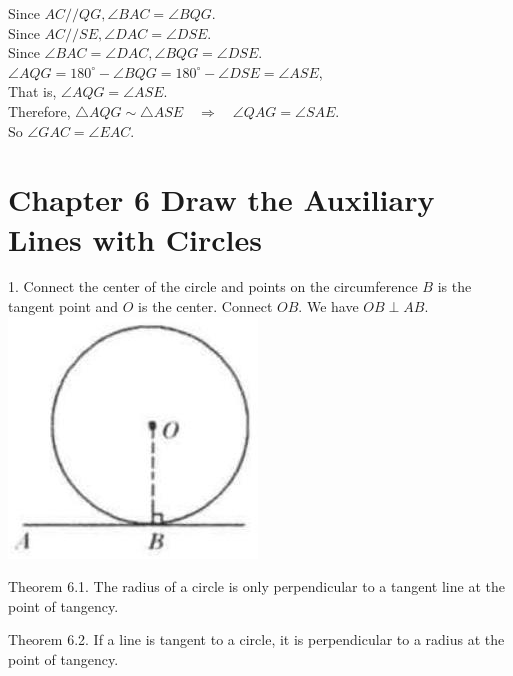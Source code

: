 \documentclass[10pt]{article}
\begin{document}
Since \(A C / / Q G, \angle B A C=\angle B Q G\).\\
Since \(A C / / S E, \angle D A C=\angle D S E\).\\
Since \(\angle B A C=\angle D A C, \angle B Q G=\angle D S E\).\\
\(\angle A Q G=180^{\circ}-\angle B Q G=180^{\circ}-\angle D S E=\angle A S E\),\\
That is, \(\angle A Q G=\angle A S E\).\\
Therefore, \(\triangle A Q G \sim \triangle A S E \quad \Rightarrow \quad \angle Q A G=\angle S A E\).\\
So \(\angle G A C=\angle E A C\).

\section*{Chapter 6 Draw the Auxiliary Lines with Circles}
1. Connect the center of the circle and points on the circumference
\(B\) is the tangent point and \(O\) is the center. Connect \(O B\). We have \(O B \perp A B\).\\
\includegraphics[max width=\textwidth, center]{2025_04_17_97bc1f7e44d93c271a88g-146}

Theorem 6.1. The radius of a circle is only perpendicular to a tangent line at the point of tangency.

Theorem 6.2. If a line is tangent to a circle, it is perpendicular to a radius at the point of tangency.
\end{document}
